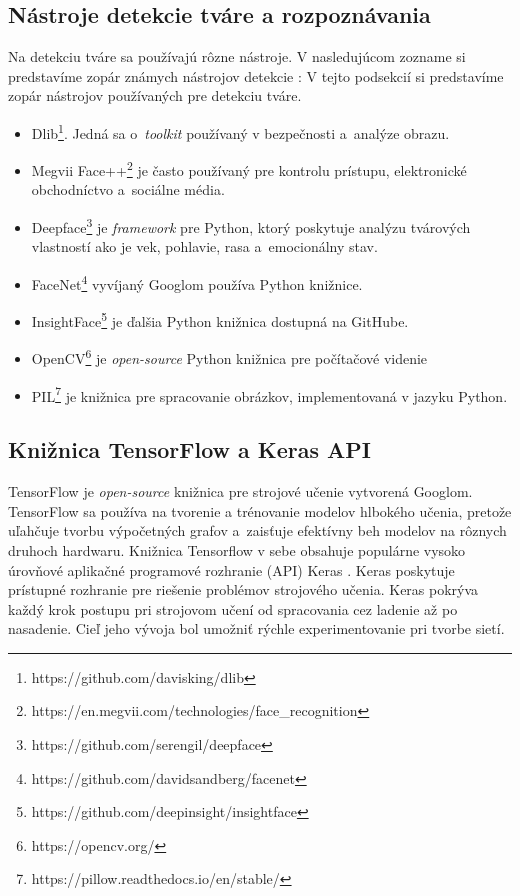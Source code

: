 \subsection{Nástroje detekcie tváre a rozpoznávania}
Na detekciu tváre sa používajú rôzne nástroje. V nasledujúcom zozname si predstavíme zopár známych nástrojov detekcie \cite{face_rec_med2,face_detect}:
V tejto podsekcií si predstavíme zopár nástrojov používaných pre detekciu tváre.
\begin{itemize}
    \item Dlib\footnote{https://github.com/davisking/dlib}. Jedná sa o~\textit{toolkit} používaný v bezpečnosti a~analýze obrazu.
    \item Megvii Face++\footnote{https://en.megvii.com/technologies/face\_recognition} je často používaný pre kontrolu prístupu, elektronické obchodníctvo a~sociálne média.
    \item Deepface\footnote{https://github.com/serengil/deepface} je \textit{framework} pre Python, ktorý poskytuje analýzu tvárových vlastností ako je vek, pohlavie, rasa a~emocionálny stav.
    \item FaceNet\footnote{https://github.com/davidsandberg/facenet} vyvíjaný Googlom používa Python knižnice.
    \item InsightFace\footnote{https://github.com/deepinsight/insightface} je ďalšia Python knižnica dostupná na GitHube.
    \item OpenCV\footnote{https://opencv.org/} je \textit{open-source} Python knižnica pre počítačové videnie 
    \item PIL\footnote{https://pillow.readthedocs.io/en/stable/} je knižnica pre spracovanie obrázkov, implementovaná v jazyku Python.
\end{itemize}

\subsection{Knižnica TensorFlow a Keras API}
TensorFlow \cite{tensorflow2015-whitepaper} je \textit{open-source} knižnica pre strojové učenie vytvorená Googlom. TensorFlow sa používa na tvorenie a trénovanie modelov hlbokého učenia, pretože uľahčuje tvorbu výpočetných grafov a~zaisťuje efektívny beh modelov na rôznych druhoch hardwaru. Knižnica Tensorflow v sebe obsahuje populárne vysoko úrovňové aplikačné programové rozhranie (API) Keras \cite{chollet2015keras}. Keras poskytuje prístupné rozhranie pre riešenie problémov strojového učenia. Keras pokrýva každý krok postupu pri strojovom učení od spracovania cez ladenie až po nasadenie. Cieľ jeho vývoja bol umožniť rýchle experimentovanie pri tvorbe sietí.

